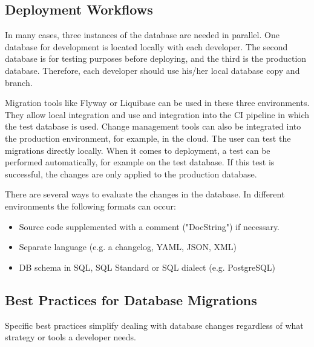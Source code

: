 \subsection{Deployment Workflows}
%
In many cases, three instances of the database are needed in parallel. One database for development is located locally with each developer. The second database is for testing purposes before deploying, and the third is the production database. Therefore, each developer should use his/her local database copy and branch.

Migration tools like Flyway or Liquibase can be used in these three environments. They allow local integration and use and integration into the CI pipeline in which the test database is used. Change management tools can also be integrated into the production environment, for example, in the cloud. The user can test the migrations directly locally. When it comes to deployment, a test can be performed automatically, for example on the test database. If this test is successful, the changes are only applied to the production database.

%
There are several ways to evaluate the changes in the database. In different environments the following formats can occur:
\begin{itemize}
	\item Source code supplemented with a comment ("DocString") if necessary.
	\item Separate language (e.g. a changelog, YAML, JSON, XML)
	\item DB schema in SQL, SQL Standard or SQL dialect (e.g. PostgreSQL)
\end{itemize}


\subsection{Best Practices for Database Migrations \label{best_practices}}%
%
Specific best practices simplify dealing with database changes regardless of what strategy or tools a developer needs.

